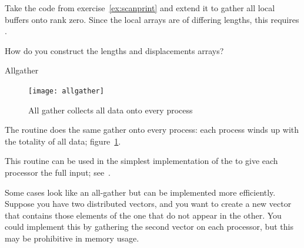 \begin{exercise}
  \label{ex:scangather}
  Take the code from exercise~\ref{ex:scanprint} and extend it to gather
  all local buffers onto rank zero.
  Since the local arrays are of differing lengths,
  this requires .

  How do you construct the lengths and displacements arrays?
\end{exercise}

 {Allgather}

\begin{figure}[ht]
  \texttt{[image: allgather]}
  \caption{All gather collects all data onto every process}
  \label{fig:allgather}
\end{figure}

The  routine does the same gather onto
every process: each process winds up with the totality of all data;
figure~\ref{fig:allgather}.

This routine can be used in the simplest implementation of the 
%
 to give each processor the
full input; see~.

Some cases look like an all-gather but can be implemented more
efficiently. Suppose you have two distributed vectors, and you want to
create a new vector that contains those elements of the one that do
not appear in the other. You could implement this by gathering the
second vector on each processor, but this may be prohibitive in memory
usage.

